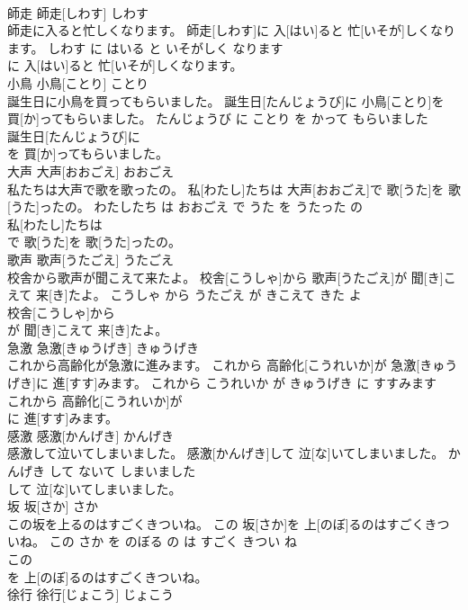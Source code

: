 \documentclass[8pt]{extreport}
\begin{document}
\begin{CJK}{UTF8}{min}
\\	師走	師走[しわす]	しわす	
\\	師走に入ると忙しくなります。	師走[しわす]に 入[はい]ると 忙[いそが]しくなります。	しわす に はいる と いそがしく なります	
\\	に 入[はい]ると 忙[いそが]しくなります。			
\\	小鳥	小鳥[ことり]	ことり	
\\	誕生日に小鳥を買ってもらいました。	誕生日[たんじょうび]に 小鳥[ことり]を 買[か]ってもらいました。	たんじょうび に ことり を かって もらいました	
\\	誕生日[たんじょうび]に
\\	を 買[か]ってもらいました。			
\\	大声	大声[おおごえ]	おおごえ	
\\	私たちは大声で歌を歌ったの。	私[わたし]たちは 大声[おおごえ]で 歌[うた]を 歌[うた]ったの。	わたしたち は おおごえ で うた を うたった の	
\\	私[わたし]たちは
\\	で 歌[うた]を 歌[うた]ったの。			
\\	歌声	歌声[うたごえ]	うたごえ	
\\	校舎から歌声が聞こえて来たよ。	校舎[こうしゃ]から 歌声[うたごえ]が 聞[き]こえて 来[き]たよ。	こうしゃ から うたごえ が きこえて きた よ	
\\	校舎[こうしゃ]から
\\	が 聞[き]こえて 来[き]たよ。			
\\	急激	急激[きゅうげき]	きゅうげき	
\\	これから高齢化が急激に進みます。	これから 高齢化[こうれいか]が 急激[きゅうげき]に 進[すす]みます。	これから こうれいか が きゅうげき に すすみます	
\\	これから 高齢化[こうれいか]が
\\	に 進[すす]みます。			
\\	感激	感激[かんげき]	かんげき	
\\	感激して泣いてしまいました。	感激[かんげき]して 泣[な]いてしまいました。	かんげき して ないて しまいました	
\\	して 泣[な]いてしまいました。			
\\	坂	坂[さか]	さか	
\\	この坂を上るのはすごくきついね。	この 坂[さか]を 上[のぼ]るのはすごくきついね。	この さか を のぼる の は すごく きつい ね	
\\	この
\\	を 上[のぼ]るのはすごくきついね。			
\\	徐行	徐行[じょこう]	じょこう	

\end{CJK}
\end{document}
